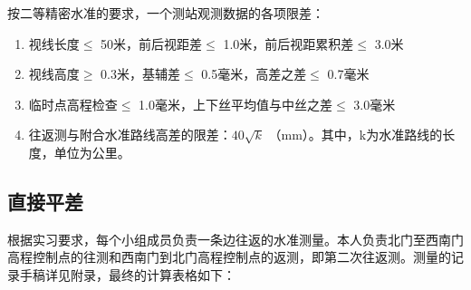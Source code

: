\documentclass[a4paper,16pt,UTF8]{article}
\begin{document}
按二等精密水准的要求，一个测站观测数据的各项限差：
\begin{enumerate}
    \item 视线长度$\leq$ 50米，前后视距差$\leq$ 1.0米，前后视距累积差$\leq$ 3.0米
    \item 视线高度$\geq$ 0.3米，基辅差$\leq$ 0.5毫米，高差之差$\leq$ 0.7毫米
    \item 临时点高程检查$\leq$ 1.0毫米，上下丝平均值与中丝之差$\leq$ 3.0毫米
    \item 往返测与附合水准路线高差的限差：$40 \sqrt{k}$ （mm）。其中，k为水准路线的长度，单位为公里。
\end{enumerate}


\subsection{\Large 直接平差}
根据实习要求，每个小组成员负责一条边往返的水准测量。本人负责北门至西南门高程控制点的往测和西南门到北门高程控制点的返测，即第二次往返测。测量的记录手稿详见附录，最终的计算表格如下：
\end{document}
